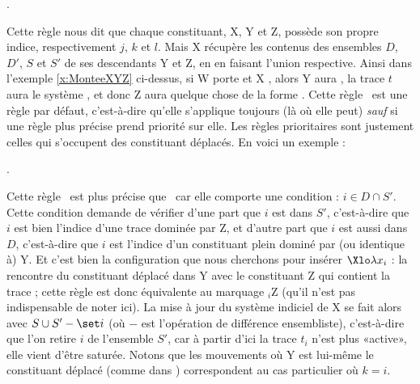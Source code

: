 \ex.


Cette règle nous dit que chaque constituant, X, Y et Z, possède son propre indice, respectivement $j$, $k$ et $l$. Mais X récupère les contenus des ensembles $D$, $D'$, $S$ et $S'$ de ses descendants Y et Z, en en faisant l'union respective.  Ainsi dans l'exemple \ref{x:MonteeXYZ} ci-dessus, si W porte  et X , alors Y aura , la trace $t$ aura le système , et donc Z aura quelque chose de la forme .
Cette règle \Last\ est une règle par défaut, c'est-à-dire qu'elle s'applique toujours (là où elle peut) \emph{sauf} si une règle plus précise prend priorité sur elle.  
Les règles prioritaires sont justement celles qui s'occupent des constituant déplacés. 
En voici un exemple :

\ex.
\label{RI:QRretrieve}


Cette règle \Last\ est plus précise que \LLast\ car elle comporte une condition : $i\in D\cap S'$.  Cette condition demande de vérifier d'une part que $i$ est dans $S'$, c'est-à-dire que $i$ est bien l'indice d'une trace dominée par Z, et d'autre part que $i$ est aussi dans $D$, c'est-à-dire que $i$ est l'indice d'un constituant plein dominé par (ou identique à) Y. 
Et c'est bien la configuration que nous cherchons pour insérer $\Xlo\lambda x_i$ : la rencontre du constituant déplacé dans Y avec le constituant Z qui contient la trace ; cette règle est donc équivalente au marquage ${}_i$Z (qu'il n'est pas indispensable de noter ici).
La mise à jour du système indiciel de X se fait alors avec 
$S\cup S'-\set i$ (où $-$ est l'opération de différence ensembliste), c'est-à-dire que l'on retire $i$ de l'ensemble $S'$, car à partir d'ici la trace $t_i$ n'est plus «active», elle vient d'être saturée.  Notons que les mouvements où Y est lui-même le constituant déplacé (comme dans ) correspondent au cas particulier où $k=i$.

